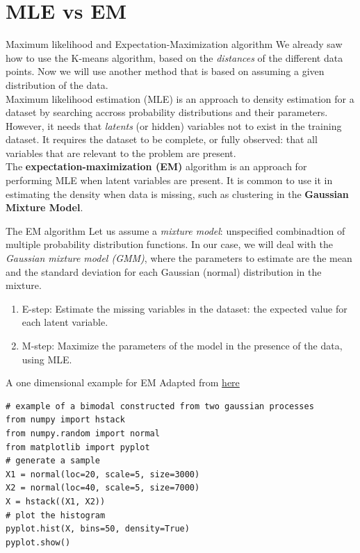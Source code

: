 \documentclass{beamer}
\begin{document}
\section{MLE vs EM}
\begin{frame}{Maximum likelihood and Expectation-Maximization algorithm}
    We already saw how to use the K-means algorithm, based on the {\em distances} of the different data points. Now we will use another method that is based on assuming a given distribution of the data. 
    \\[10pt]
    Maximum likelihood estimation (MLE) is an approach to density estimation for a dataset by searching accross probability distributions and their parameters. However, it needs that {\em latents} (or hidden) variables not to exist in the training dataset. It requires the dataset to be complete, or fully observed: that all variables that are relevant to the problem are present.
    \\[10pt]
    The {\bf expectation-maximization (EM)} algorithm is an approach for performing MLE when latent variables are present. It is common to use it in estimating the density when data is missing, such as clustering in the {\bf Gaussian Mixture Model}.
\end{frame}

\begin{frame}{The EM algorithm}
    Let us assume a {\em mixture model}: unspecified combinadtion of multiple probability distribution functions. In our case, we will deal with the {\em Gaussian mixture model (GMM)}, where the parameters to estimate are the mean and the standard deviation for each Gaussian (normal) distribution in the mixture.
    \begin{enumerate}
        \item E-step: Estimate the missing variables in the dataset: the expected value for each latent variable.
        \item M-step: Maximize the parameters of the model in the presence of the data, using MLE.
    \end{enumerate}
\end{frame}

\begin{frame}[fragile]{A one dimensional example for EM}
    Adapted from \href{https://machinelearningmastery.com/expectation-maximization-em-algorithm/}{here}
    \begin{lstlisting}
# example of a bimodal constructed from two gaussian processes
from numpy import hstack
from numpy.random import normal
from matplotlib import pyplot
# generate a sample
X1 = normal(loc=20, scale=5, size=3000)
X2 = normal(loc=40, scale=5, size=7000)
X = hstack((X1, X2))
# plot the histogram
pyplot.hist(X, bins=50, density=True)
pyplot.show()
    \end{lstlisting}
\end{frame}
\end{document}
